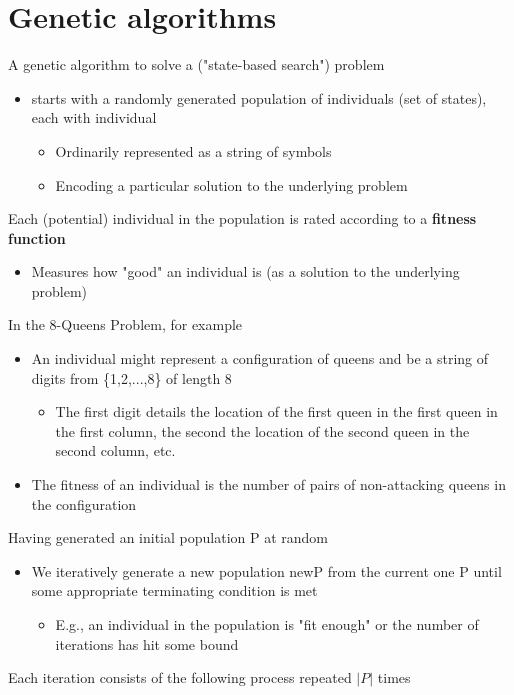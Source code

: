 \documentclass{article}[18pt]
\begin{document}
\section{Genetic algorithms}
A genetic algorithm to solve a ("state-based search") problem
\begin{itemize}
	\item starts with a randomly generated population of individuals (set of states), each with individual
	\begin{itemize}
		\item Ordinarily represented as a string of symbols
		\item Encoding a particular solution to the underlying problem
	\end{itemize}
\end{itemize}
Each (potential) individual in the population is rated according to a \textbf{fitness function}
\begin{itemize}
	\item Measures how "good" an individual is (as a solution to the underlying problem)
\end{itemize}
In the 8-Queens Problem, for example
\begin{itemize}
	\item An individual might represent a configuration of queens and be a string of digits from \{1,2,...,8\} of length 8
	\begin{itemize}
		\item The first digit details the location of the first queen in the first queen in the first column, the second the location of the second queen in the second column, etc.
	\end{itemize}
	\item The fitness of an individual is the number of pairs of non-attacking queens in the configuration
\end{itemize}
Having generated an initial population P at random
\begin{itemize}
	\item We iteratively generate a new population newP from the current one P until some appropriate terminating condition is met
	\begin{itemize}
		\item E.g., an individual in the population is "fit enough" or the number of iterations has hit some bound
	\end{itemize}
\end{itemize}
Each iteration consists of the following process repeated $|P|$ times
\end{document}
